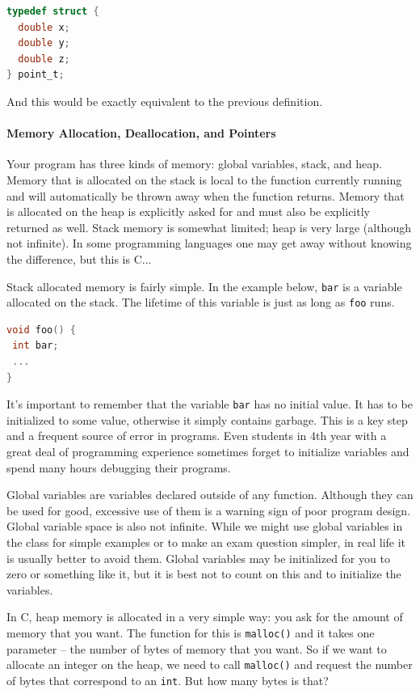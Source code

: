 \begin{lstlisting}[language=C]
typedef struct {
  double x;
  double y;
  double z;
} point_t;
\end{lstlisting}

And this would be exactly equivalent to the previous definition.

\paragraph{Memory Allocation, Deallocation, and Pointers}

Your program has three kinds of memory: global variables, stack, and heap. Memory that is allocated on the stack is local to the function currently running and will automatically be thrown away when the function returns. Memory that is allocated on the heap is explicitly asked for and must also be explicitly returned as well. Stack memory is somewhat limited; heap is very large (although not infinite). In some programming languages one may get away without knowing the difference, but this is C...

Stack allocated memory is fairly simple. In the example below, \texttt{bar} is a variable allocated on the stack. The lifetime of this variable is just as long as \texttt{foo} runs.

\begin{lstlisting}[language=C]
void foo() {
 int bar;
 ...
}
\end{lstlisting}

It's important to remember that the variable \texttt{bar} has no initial value. It has to be initialized to some value, otherwise it simply contains garbage. This is a key step and a frequent source of error in programs. Even students in 4th year with a great deal of programming experience sometimes forget to initialize variables and spend many hours debugging their programs.

Global variables are variables declared outside of any function. Although they can be used for good, excessive use of them is a warning sign of poor program design. Global variable space is also not infinite. While we might use global variables in the class for simple examples or to make an exam question simpler, in real life it is usually better to avoid them. Global variables may be initialized for you to zero or something like it, but it is best not to count on this and to initialize the variables.

In C, heap memory is allocated in a very simple way: you ask for the amount of memory that you want. The function for this is \texttt{malloc()} and it takes one parameter -- the number of bytes of memory that you want. So if we want to allocate an integer on the heap, we need to call \texttt{malloc()} and request the number of bytes that correspond to an \texttt{int}. But how many bytes is that?

